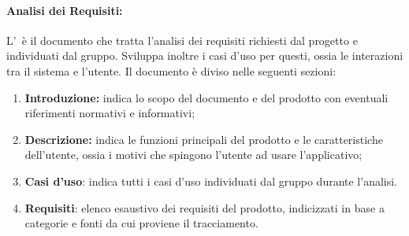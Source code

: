 \paragraph{Analisi dei Requisiti:}
L'\AdR\ è il documento che tratta l'analisi dei requisiti richiesti dal progetto e individuati dal gruppo. Sviluppa inoltre i casi d'uso per questi, ossia le interazioni tra il sistema e l'utente.
Il documento è diviso nelle seguenti sezioni:
\begin{enumerate}
  \item \textbf{Introduzione:} indica lo scopo del documento e del prodotto con eventuali riferimenti normativi e informativi;
  \item \textbf{Descrizione:} indica le funzioni principali del prodotto e le caratteristiche dell'utente, ossia i motivi che spingono l'utente ad usare l'applicativo;
  \item \textbf{Casi d'uso}: indica tutti i casi d'uso individuati dal gruppo durante l'analisi.
  \item \textbf{Requisiti}: elenco esaustivo dei requisiti del prodotto, indicizzati in base a categorie e fonti da cui proviene il tracciamento.
\end{enumerate}

